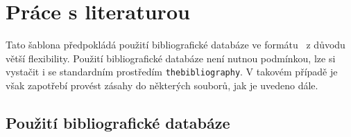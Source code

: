
\chapter{Práce s literaturou}

Tato šablona předpokládá použití bibliografické databáze ve formátu \BibTeX\ z důvodu větší flexibility. Použití bibliografické databáze není nutnou podmínkou, lze si vystačit i se standardním prostředím \texttt{thebibliography}. V takovém případě je však zapotřebí provést zásahy do některých souborů, jak je uvedeno dále.

\section{Použití bibliografické databáze}

